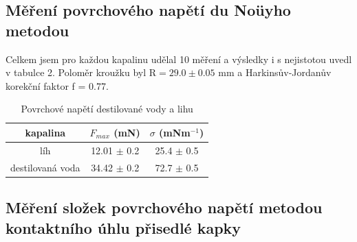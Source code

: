 \documentclass[a4paper,11pt]{article}
\begin{document}
\subsection{Měření povrchového napětí du Noüyho metodou}

Celkem jsem pro každou kapalinu udělal 10 měření a výsledky i s nejistotou uvedl v tabulce 2. Poloměr kroužku byl R$= 29.0 \pm 0.05$ mm a Harkinsův-Jordanův korekční faktor f = 0.77.


\begin{table}[htpb]
  \centering
  \begin{tabular}{| c | c | c |}
    \hline
    kapalina & $F_{max}$ (mN) & $\sigma$ (mNm$^{-1}$) \\\hline
    líh & 12.01 $\pm$ 0.2 & 25.4 $\pm$ 0.5 \\
    destilovaná voda & 34.42 $\pm$ 0.2 & 72.7 $\pm$ 0.5 \\ \hline
  \end{tabular}
  \caption{Povrchové napětí destilované vody a lihu}
\end{table}

\vspace{-10pt}

\subsection{Měření složek povrchového napětí metodou kontaktního úhlu přisedlé kapky}
\end{document}
